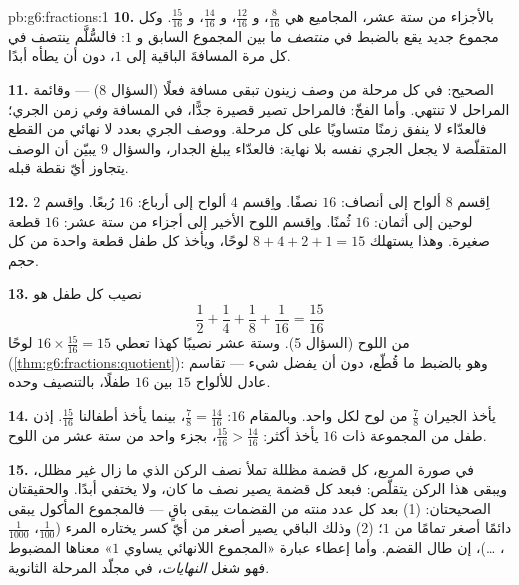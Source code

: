 \begin{solution}{pb:g6:fractions:1}
\textbf{10.} بالأجزاء من ستة عشر، المجاميع هي $\frac{8}{16}$،
و $\frac{12}{16}$، و $\frac{14}{16}$، و $\frac{15}{16}$. وكل مجموع جديد
يقع بالضبط في \emph{منتصف} ما بين المجموع السابق و $1$:
فالسُّلَّم ينتصف في كل مرة المسافةَ الباقية إلى $1$،
دون أن يطأه أبدًا.

\textbf{11.} الصحيح: في كل مرحلة من وصف زينون
تبقى مسافة فعلًا (السؤال 8) --- وقائمة المراحل
لا تنتهي. وأما الفخّ: فالمراحل تصير قصيرة جدًّا، في
المسافة \emph{وفي} زمن الجري؛ فالعدّاء لا ينفق
زمنًا متساويًا على كل مرحلة. ووصف الجري بعدد لا نهائي
من القطع المتقلّصة لا يجعل الجري نفسه بلا نهاية:
فالعدّاء يبلغ الجدار، والسؤال 9 يبيّن أن الوصف
يتجاوز أيّ نقطة قبله.

\textbf{12.} اِقسم $8$ ألواح إلى أنصاف: $16$ نصفًا. واِقسم $4$
ألواح إلى أرباع: $16$ رُبعًا. واِقسم $2$ لوحين إلى
أثمان: $16$ ثُمنًا. واِقسم اللوح الأخير إلى أجزاء من ستة عشر:
$16$ قطعة صغيرة. وهذا يستهلك $8 + 4 + 2 + 1 = 15$ لوحًا، ويأخذ كل
طفل قطعة واحدة من كل حجم.

\textbf{13.} نصيب كل طفل هو
\[
\frac12 + \frac14 + \frac18 + \frac{1}{16} = \frac{15}{16}
\]
من اللوح (السؤال 5). وستة عشر نصيبًا كهذا تعطي
$16 \times \frac{15}{16} = 15$ لوحًا
(\cref{thm:g6:fractions:quotient}): وهو بالضبط ما قُطّع، دون
أن يفضل شيء --- تقاسم عادل للألواح $15$ بين $16$
طفلًا، بالتنصيف وحده.

\textbf{14.} يأخذ الجيران $\frac78$ من لوح لكل واحد. وبالمقام
$16$: $\frac78 = \frac{14}{16}$، بينما يأخذ أطفالنا
$\frac{15}{16}$. إذن طفل من المجموعة ذات $16$ يأخذ أكثر:
$\frac{15}{16} > \frac{14}{16}$، بجزء واحد من ستة عشر من اللوح.

\textbf{15.} في صورة المربع، كل قضمة مظللة تملأ نصف
الركن الذي ما زال غير مظلل، ويبقى هذا الركن
يتقلّص: فبعد كل قضمة يصير نصف ما كان، ولا
يختفي أبدًا. والحقيقتان الصحيحتان: (1) بعد كل عدد منته
من القضمات يبقى باقٍ --- فالمجموع المأكول
يبقى دائمًا أصغر تمامًا من $1$؛ (2) وذلك الباقي يصير أصغر
من أيّ كسر يختاره المرء ($\frac{1}{100}$،
$\frac{1}{1000}$، \dots)، إن طال القضم. وأما إعطاء
عبارة «المجموع اللانهائي يساوي $1$» معناها المضبوط فهو
شغل \emph{النهايات}، في مجلّد المرحلة الثانوية.
\end{solution}
